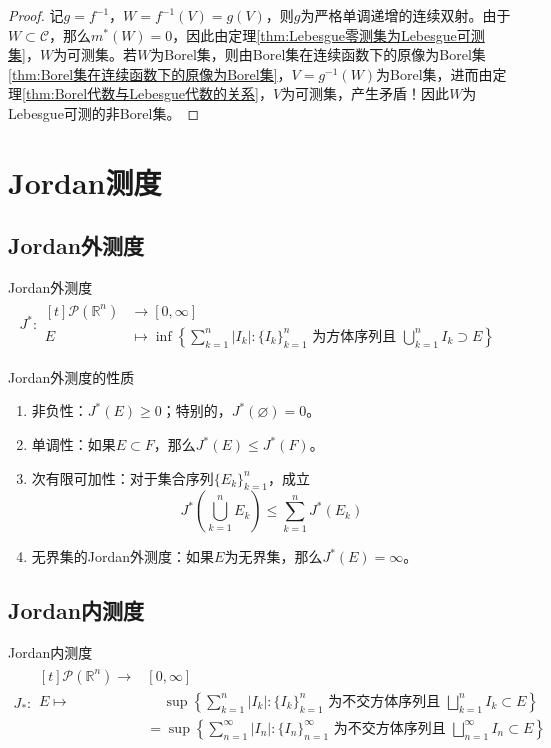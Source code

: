 \documentclass[lang = cn, scheme = chinese, thmcnt = section]{elegantbook}
\newcommand{\R}{\mathbb{R}}            %
\newcommand{\sub}{\subset}             %
\begin{document}
\begin{proof}
	记$g=f^{-1}$，$W=f^{-1}(V)=g(V)$，则$g$为严格单调递增的连续双射。由于$W\sub \mathcal{C}$，那么$m^*(W)=0$，因此由定理\ref{thm:Lebesgue零测集为Lebesgue可测集}，$W$为可测集。若$W$为Borel集，则由Borel集在连续函数下的原像为Borel集\ref{thm:Borel集在连续函数下的原像为Borel集}，$V=g^{-1}(W)$为Borel集，进而由定理\ref{thm:Borel代数与Lebesgue代数的关系}，$V$为可测集，产生矛盾！因此$W$为Lebesgue可测的非Borel集。
\end{proof}

\section{Jordan测度}

\subsection{Jordan外测度}

\begin{definition}{Jordan外测度}
	\begin{align*}
		J^*:\begin{aligned}[t]
			\mathscr{P}(\R^n) & \longrightarrow [0,\infty]\\
			E &\longmapsto\inf\left\{ \sum_{k=1}^{n}|I_k|:\{I_k\}_{k=1}^{n}\text{ 为方体序列且 } \bigcup_{k=1}^{n}I_k\supset E \right\}
		\end{aligned}
	\end{align*}
\end{definition}

\begin{theorem}{Jordan外测度的性质}
	\begin{enumerate}
		\item 非负性：$J^*(E)\ge 0$；特别的，$J^*(\varnothing)=0$。
		\item 单调性：如果$E\sub F$，那么$J^*(E)\le J^*(F)$。
		\item 次有限可加性：对于集合序列$\{ E_k \}_{k=1}^{n}$，成立
		$$
		J^*\left(\bigcup_{k=1}^{n}{E_k}\right)\le\sum_{k=1}^{n}{J^*(E_k)}
		$$
		\item 无界集的Jordan外测度：如果$E$为无界集，那么$J^*(E)=\infty$。
	\end{enumerate}
\end{theorem}

\subsection{Jordan内测度}

\begin{definition}{Jordan内测度}
	\begin{align*}
		J_*:\begin{aligned}[t]
			\mathscr{P}(\R^n)  \longrightarrow& [0,\infty]\\
			E \longmapsto&\quad \,\sup\left\{ \sum_{k=1}^{n}|I_k|:\{I_k\}_{k=1}^{n}\text{ 为不交方体序列且 } \bigsqcup_{k=1}^{n}I_k\sub E \right\}\\
			&=\sup\left\{ \sum_{n=1}^{\infty}|I_n|:\{I_n\}_{n=1}^{\infty}\text{ 为不交方体序列且 } \bigsqcup_{n=1}^{\infty}I_n\sub E \right\}
		\end{aligned}
	\end{align*}
\end{definition}
\end{document}
